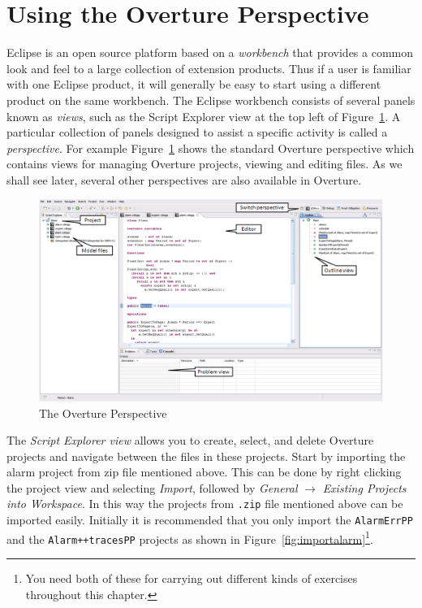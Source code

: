 \section{Using the Overture Perspective}\label{sec:vdmsupport}

Eclipse is an open source platform based on a \emph{workbench} that
provides a common look and feel to a large collection of extension
products. Thus if a user is familiar with one Eclipse product, it will
generally be easy to start using a different product on the same
workbench. The Eclipse workbench consists of several panels known as
\emph{views}, such as the Script Explorer view at the top left of
Figure~\ref{fig:OverturePerspective}. A particular
collection of panels designed to assist a specific activity is called
a \emph{perspective}. For example
Figure~\ref{fig:OverturePerspective} shows the standard
Overture perspective which contains views for managing Overture
projects, viewing and editing files. As we shall see later, several
other perspectives are also available in Overture.

\begin{figure}[!htb]
\begin{center}
  \includegraphics[width=5in]{figures/OverturePerspective}
  \caption[labelInTOC]{The Overture Perspective}
  \label{fig:OverturePerspective}
\end{center}
\end{figure}

The \emph{Script Explorer view} allows you to create, select, and
delete Overture projects and navigate between the files in these
projects. Start by importing the alarm project from zip file mentioned
above. This can be done by right clicking the project view
and selecting \emph{Import}, followed by \emph{General} $\rightarrow$
\emph{Existing Projects into Workspace}.  In this way the projects
from \texttt{.zip} file mentioned above can be imported easily. Initially it is
recommended that you only import the \texttt{AlarmErrPP} and the
\texttt{Alarm++tracesPP} projects as shown in
Figure~\ref{fig:importalarm}\footnote{You need both of these for
  carrying out different kinds of exercises throughout this chapter.}.

